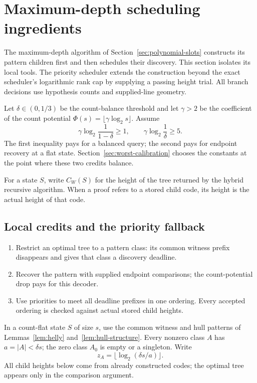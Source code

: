 \section{Maximum-depth scheduling ingredients}
\label{sec:worst}

The maximum-depth algorithm of Section~\ref{sec:polynomial-slots}
constructs its pattern children first and then schedules their discovery.
This section isolates its local tools. The priority scheduler extends
the construction beyond the exact scheduler's logarithmic rank cap by
supplying a passing height trial. All branch decisions use hypothesis
counts and supplied-line geometry.

Let $\delta\in(0,1/3)$ be the count-balance threshold and let $\gamma>2$
be the coefficient of the count potential
$\Phi(s)=\lfloor\gamma\log_2s\rfloor$. Assume
\begin{equation}\label{eq:worst-parameter-conditions}
 \gamma\log_2\frac1{1-\delta}\ge1,\qquad
 \gamma\log_2\frac1\delta\ge5.
\end{equation}
The first inequality pays for a balanced query; the second pays for
endpoint recovery at a flat state. Section~\ref{sec:worst-calibration}
chooses the constants at the point where these two credits balance.

For a state $S$, write $C_W(S)$ for the height of the tree returned
by the hybrid recursive algorithm. When a proof refers to a stored
child code, its height is the actual height of that code.

\subsection{Local credits and the priority fallback}

\begin{proofstrategy}
\begin{enumerate}
\item Restrict an optimal tree to a pattern class: its common witness
prefix disappears and gives that class a discovery deadline.
\item Recover the pattern with supplied endpoint comparisons; the
count-potential drop pays for this decoder.
\item Use priorities to meet all deadline prefixes in one ordering.
Every accepted ordering is checked against actual stored child heights.
\end{enumerate}
\end{proofstrategy}

In a count-flat state $S$ of size $s$, use the common witness and hull
patterns of Lemmas~\ref{lem:helly} and~\ref{lem:hull-structure}.
Every nonzero class $A$ has $a=|A|<\delta s$; the zero class $A_0$
is empty or a singleton. Write
\[
 z_A=\lfloor\log_2(\delta s/a)\rfloor.
\]
All child heights below come from already constructed codes; the
optimal tree appears only in the comparison argument.


